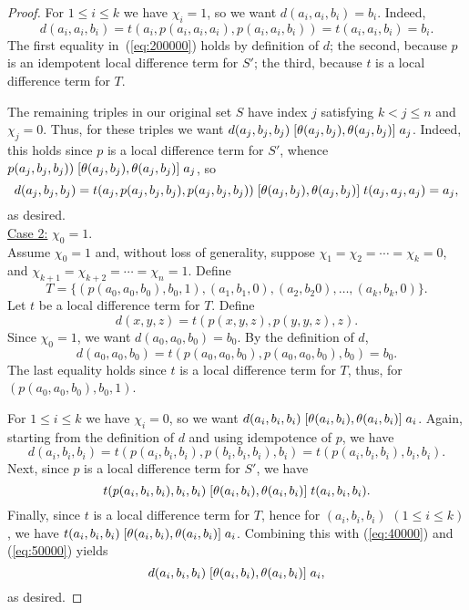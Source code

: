 \begin{proof}
For $1\leq i \leq k$ we have $\chi_i =1$, so we want  $d(a_i,a_i,b_i) = b_i$. Indeed,
\begin{equation}
  \label{eq:200000}
  d(a_i,a_i,b_i) =
  t(a_i, p(a_i,a_i,a_i), p(a_i,a_i,b_i))=
  t(a_i, a_i, b_i) =b_i.
\end{equation}
The first equality in~(\ref{eq:200000}) holds by definition of $d$;
the second, because $p$ is an idempotent local difference term for
$S'$; the third, because $t$ is a local difference term for $T$.

The remaining triples in our original set $S$
have index $j$ satisfying $k<j\leq n$ and $\chi_j = 0$.
Thus, for these triples we want
$d(a_j,b_j,b_j)\mathrel{[\operatorname{\theta}(a_j,b_j), \operatorname{\theta}(a_j,b_j)]} a_j$. Indeed,
this holds since $p$ is a local difference term for $S'$, whence
$p(a_j,b_j,b_j))  \mathrel{[\operatorname{\theta}(a_j,b_j), \operatorname{\theta}(a_j,b_j)]} a_j$, so
\begin{equation*}
  d(a_j,b_j,b_j) =
  t(a_j, p(a_j,b_j,b_j), p(a_j,b_j,b_j))
  \mathrel{[\operatorname{\theta}(a_j,b_j), \operatorname{\theta}(a_j,b_j)]} t(a_j,a_j,a_j) = a_j,
\end{equation*}
as desired.
\\[6pt]
\underline{Case 2:}
$\chi_0 = 1$.
\\[4pt]
Assume $\chi_0 = 1$ and, 
without loss of generality, suppose $\chi_1 = \chi_2 =\cdots =\chi_k = 0$,
and $\chi_{k+1} = \chi_{k+2} = \cdots = \chi_{n} = 1$. Define
\[
T = \{(p(a_0, a_0, b_0), b_0, 1),
(a_1, b_1, 0), (a_2, b_2 0), \dots, (a_k, b_k, 0)\}.
\]
Let $t$ be a local difference term for $T$.
Define
\[d(x,y,z) = t(p(x,y,z), p(y,y,z), z).\] 
Since $\chi_0 =1$, we want $d(a_0,a_0,b_0) = b_0$. By the definition of
$d$,
\begin{equation*}
  d(a_0,a_0,b_0) =
  t(p(a_0,a_0,b_0), p(a_0,a_0,b_0), b_0) =b_0.
\end{equation*}
The last equality holds since $t$ is a local difference term for $T$, thus,
for $(p(a_0, a_0, b_0), b_0, 1)$.

For $1\leq i \leq k$ we have $\chi_i =0$, so we want
$d(a_i,b_i,b_i) \mathrel{[\operatorname{\theta}(a_i,b_i), \operatorname{\theta}(a_i,b_i)]} a_i$.
Again, starting from the definition of $d$ and using idempotence of $p$, we have
\begin{equation}
  \label{eq:40000}
  d(a_i,b_i,b_i) =
  t(p(a_i,b_i,b_i), p(b_i,b_i,b_i), b_i)=
  t(p(a_i,b_i,b_i), b_i, b_i).
\end{equation}
Next, since $p$ is a local difference term for $S'$, we have
\begin{equation}
  \label{eq:50000}
  t(p(a_i,b_i,b_i), b_i, b_i)
 \comm{\Cg(a_i,b_i)}{\Cg(a_i,b_i)}
 t(a_i, b_i, b_i).
\end{equation}
Finally, since $t$ is a local difference term for $T$, hence for
$(a_i, b_i, b_i)$ $(1\leq i \leq k)$, we have 
$t(a_i, b_i, b_i) \mathrel{[\operatorname{\theta}(a_i,b_i), \operatorname{\theta}(a_i,b_i)]} a_i$.
Combining this with (\ref{eq:40000}) and (\ref{eq:50000}) yields
\[
d(a_i,b_i,b_i) \mathrel{[\operatorname{\theta}(a_i,b_i), \operatorname{\theta}(a_i,b_i)]} a_i,
\]
as desired.


\end{proof}
